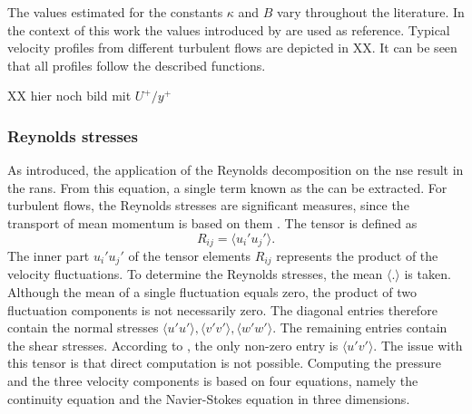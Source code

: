 The values estimated for the constants $\kappa$ and $B$ vary throughout the literature.
In the context of this work the values introduced by \citet{pope_turbulent_2015} are used as reference.
Typical velocity profiles from different turbulent flows are depicted in XX.
It can be seen that all profiles follow the described functions.

XX hier noch bild mit $U^+/y^+$


\subsubsection{Reynolds stresses}

As  introduced,  the application of the Reynolds decomposition on the \acrshort{nse} result in the \acrshort{rans}.
From this equation, a single term known as the  can be extracted.
For turbulent flows, the Reynolds stresses are significant measures, since the transport of mean momentum is based on them \citep{moin_fundamentals_2024}. 
The tensor is defined as 
\begin{equation}
    R_{ij} =  \langle u_i' u_j'\rangle.
\end{equation}
The inner part $u_i' u_j'$ of the tensor elements $R_{ij}$ represents the product of the velocity fluctuations.
To determine the Reynolds stresses, the mean $\langle . \rangle$  is taken.
Although the mean of a single fluctuation equals zero, the product of two fluctuation components is not necessarily zero. 
The diagonal entries therefore contain the normal stresses $\langle u' u'\rangle, \langle v' v'\rangle, \langle w' w'\rangle$.
The remaining entries contain the shear stresses.
According to \citep{schlichting_boundary-layer_2017}, the only non-zero entry is $\langle u' v'\rangle$.
The issue with this tensor is that direct computation is not possible.
%
Computing the pressure and the three velocity components is based on  four equations, namely the continuity equation and the Navier-Stokes equation in three dimensions.

